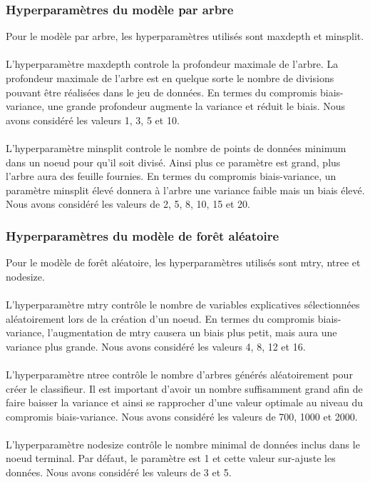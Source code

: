 \subsubsection{Hyperparamètres du modèle par arbre}
Pour le modèle par arbre, les hyperparamètres utilisés sont maxdepth et minsplit. \\\\ 
L'hyperparamètre maxdepth controle la profondeur maximale de l'arbre. La profondeur maximale de l'arbre est en quelque sorte le nombre de divisions pouvant être réalisées dans le jeu de données. En termes du compromis biais-variance, une grande profondeur augmente la variance et réduit le biais. Nous avons considéré les valeurs 1, 3, 5 et 10.\\ \\ 
L'hyperparamètre minsplit controle le nombre de points de données minimum dans un noeud pour qu'il soit divisé. Ainsi plus ce paramètre est grand, plus l'arbre aura des feuille fournies. En termes du compromis biais-variance, un paramètre minsplit élevé donnera à l'arbre une variance faible mais un biais élevé. Nous avons considéré les valeurs de 2, 5, 8, 10, 15 et 20.

\subsubsection{Hyperparamètres du modèle de forêt aléatoire}
Pour le modèle de forêt aléatoire, les hyperparamètres utilisés sont mtry, ntree et nodesize.\\\\ 
L'hyperparamètre mtry contrôle le nombre de variables explicatives sélectionnées aléatoirement lors de la création d'un noeud. En termes du compromis biais-variance, l'augmentation de mtry causera un biais plus petit, mais aura une variance plus grande.  Nous avons considéré les valeurs 4, 8, 12 et 16.\\\\ 
L'hyperparamètre ntree contrôle le nombre d'arbres générés aléatoirement pour créer le classifieur. Il est important d'avoir un nombre suffisamment grand afin de faire baisser la variance et ainsi se rapprocher d'une valeur optimale au niveau du compromis biais-variance. Nous avons considéré les valeurs de 700, 1000 et 2000.\\ \\ 
L'hyperparamètre nodesize contrôle le nombre minimal de données inclus dans le noeud terminal. Par défaut, le paramètre est 1 et cette valeur sur-ajuste les données. Nous avons considéré les valeurs de 3 et 5.

